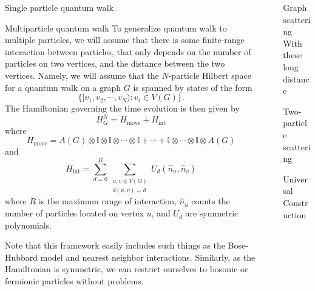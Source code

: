 \documentclass{beamer}
\newlength{\sepwid}
\newlength{\onecolwid}
\newcommand{\sket}[1]{|{#1}\rangle}
\newcommand{\II}{\mathbb{I}}
\begin{document}
\begin{frame}[t]
\begin{columns}[t]
\begin{column}{\onecolwid}
\begin{block}{Single particle quantum walk}
  \end{block}


  \begin{block}{Multiparticle quantum walk}
    To generalize quantum walk to multiple particles, we will assume that there is some finite-range interaction between particles, that only depends on the number of particles on two vertices, and the distance between the two vertices.  Namely, we will assume that the $N$-particle Hilbert space for a quantum walk on a graph $G$ is spanned by states of the form
    \[
      \big\{\sket{v_1,v_2,\cdots,v_N}: v_i\in V(G)\big\}.
    \]
    The Hamiltonian governing the time evolution is then given by
    \[
      H_G^N = H_{\text{move}} + H_{\text{int}}
    \]
    where
    \[
      H_{\text{move}} = A(G)\otimes \II\otimes \II \otimes \cdots \otimes \II + \cdots + \II \otimes \cdots\otimes \II \otimes A(G)
    \]
    and
    \[
      H_{\text{int}} = \sum_{d=0}^{R} \sum_{\substack{u,v\in V(G)\\d(u,v)=d}} U_{d}(\hat{n}_u,\hat{n}_v)
    \]
    where $R$ is the maximum range of interaction, $\hat{n}_u$ counts the number of particles located on vertex $u$, and $U_d$ are symmetric polynomials.

    Note that this framework easily includes such things as the Bose-Hubbard model and nearest neighbor interactions.  Similarly, as the Hamiltonian is symmetric, we can restrict ourselves to bosonic or fermionic particles without problems.
    
    
  \end{block}

\end{column}

\begin{column}{\sepwid}\end{column}

\begin{column}{\onecolwid}
  \begin{block}{Graph scattering}
    With these long distance 
  \end{block}

  \begin{block}{Two-particle scattering}

  \end{block}

  \begin{block}{Universal Construction}

  \end{block}


\end{column}
\end{columns}
\end{frame}
\end{document}
